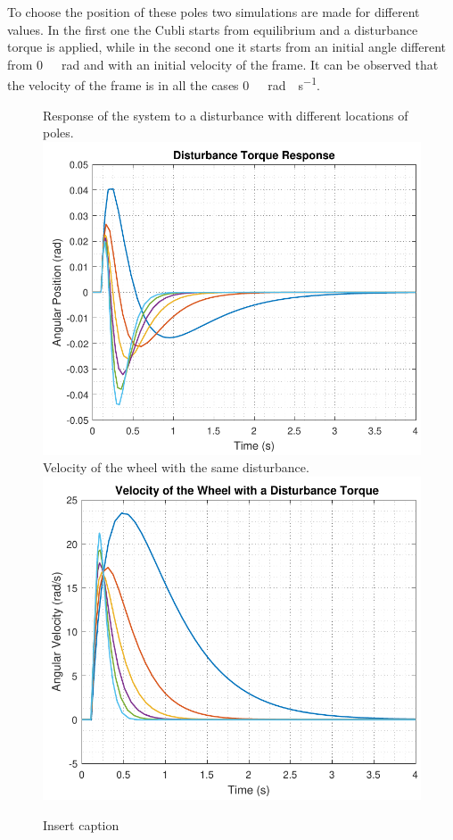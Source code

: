 To choose the position of these poles two simulations are made for different values. In the first one the Cubli starts from equilibrium and a disturbance torque is applied, while in the second one it starts from an initial angle different from \si{0\ rad} and with an initial velocity of the frame.  It can be observed that the velocity of the frame is in all the cases \si{0\ rad \cdot s^{-1}}.
\begin{figure}[H]
	\begin{minipage}{\linewidth}
		\captionsetup[subfigure]{font = footnotesize}
		\centering
		\subcaptionbox
		{
			Response of the system to a disturbance with different locations of poles.
			\label{disturbanceStateSpace}
		}
		{
			\includegraphics[scale=.55]{figures/disturbanceStateSpace}
		}\quad
		\subcaptionbox
		{
			Velocity of the wheel with the same disturbance.
			\label{disturbanceStateSpaceWheel}
		}
		{
			\includegraphics[scale=.55]{figures/disturbanceStateSpaceWheel}
		}
		\caption{Insert caption}
		\label{disturbanceStateSpaceFrameAndWheel}
	\end{minipage}
\end{figure}
